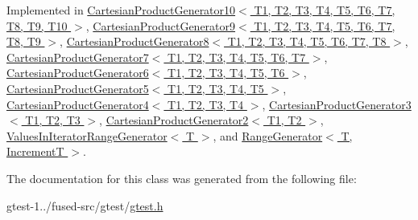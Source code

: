 \-Implemented in \hyperlink{classtesting_1_1internal_1_1CartesianProductGenerator10_a2175654afa23856e885489861c353c72}{\-Cartesian\-Product\-Generator10$<$ T1, T2, T3, T4, T5, T6, T7, T8, T9, T10 $>$}, \hyperlink{classtesting_1_1internal_1_1CartesianProductGenerator9_a2175654afa23856e885489861c353c72}{\-Cartesian\-Product\-Generator9$<$ T1, T2, T3, T4, T5, T6, T7, T8, T9 $>$}, \hyperlink{classtesting_1_1internal_1_1CartesianProductGenerator8_a2175654afa23856e885489861c353c72}{\-Cartesian\-Product\-Generator8$<$ T1, T2, T3, T4, T5, T6, T7, T8 $>$}, \hyperlink{classtesting_1_1internal_1_1CartesianProductGenerator7_a2175654afa23856e885489861c353c72}{\-Cartesian\-Product\-Generator7$<$ T1, T2, T3, T4, T5, T6, T7 $>$}, \hyperlink{classtesting_1_1internal_1_1CartesianProductGenerator6_a2175654afa23856e885489861c353c72}{\-Cartesian\-Product\-Generator6$<$ T1, T2, T3, T4, T5, T6 $>$}, \hyperlink{classtesting_1_1internal_1_1CartesianProductGenerator5_a2175654afa23856e885489861c353c72}{\-Cartesian\-Product\-Generator5$<$ T1, T2, T3, T4, T5 $>$}, \hyperlink{classtesting_1_1internal_1_1CartesianProductGenerator4_a2175654afa23856e885489861c353c72}{\-Cartesian\-Product\-Generator4$<$ T1, T2, T3, T4 $>$}, \hyperlink{classtesting_1_1internal_1_1CartesianProductGenerator3_a2175654afa23856e885489861c353c72}{\-Cartesian\-Product\-Generator3$<$ T1, T2, T3 $>$}, \hyperlink{classtesting_1_1internal_1_1CartesianProductGenerator2_a2175654afa23856e885489861c353c72}{\-Cartesian\-Product\-Generator2$<$ T1, T2 $>$}, \hyperlink{classtesting_1_1internal_1_1ValuesInIteratorRangeGenerator_a4dd9259ea3453866b5475f17f27d8370}{\-Values\-In\-Iterator\-Range\-Generator$<$ T $>$}, and \hyperlink{classtesting_1_1internal_1_1RangeGenerator_a4dd9259ea3453866b5475f17f27d8370}{\-Range\-Generator$<$ T, Increment\-T $>$}.



\-The documentation for this class was generated from the following file\-:\begin{DoxyCompactItemize}
\item 
gtest-\/1../fused-\/src/gtest/\hyperlink{fused-src_2gtest_2gtest_8h}{gtest.\-h}\end{DoxyCompactItemize}
